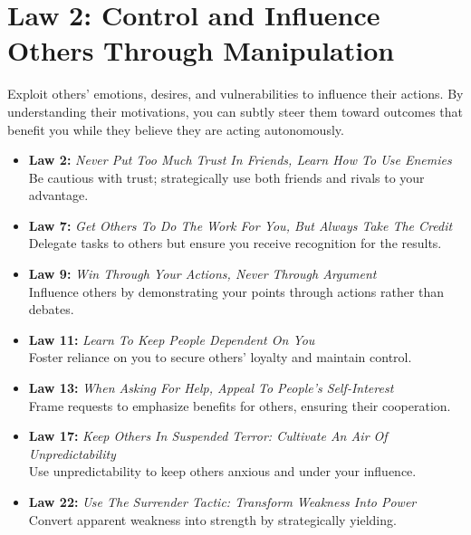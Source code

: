 \documentclass[a4paper,10.8pt]{article}
\begin{document}
\clearpage

\section*{Law 2: Control and Influence Others Through Manipulation}
Exploit others' emotions, desires, and vulnerabilities to influence their actions. By understanding their motivations, you can subtly steer them toward outcomes that benefit you while they believe they are acting autonomously.

\begin{itemize}[leftmargin=*, label={--}]
    \item \textbf{Law 2:} \textit{Never Put Too Much Trust In Friends, Learn How To Use Enemies} \\
    Be cautious with trust; strategically use both friends and rivals to your advantage.
    
    \item \textbf{Law 7:} \textit{Get Others To Do The Work For You, But Always Take The Credit} \\
    Delegate tasks to others but ensure you receive recognition for the results.
    
    \item \textbf{Law 9:} \textit{Win Through Your Actions, Never Through Argument} \\
    Influence others by demonstrating your points through actions rather than debates.
    
    \item \textbf{Law 11:} \textit{Learn To Keep People Dependent On You} \\
    Foster reliance on you to secure others' loyalty and maintain control.
    
    \item \textbf{Law 13:} \textit{When Asking For Help, Appeal To People's Self-Interest} \\
    Frame requests to emphasize benefits for others, ensuring their cooperation.
    
    \item \textbf{Law 17:} \textit{Keep Others In Suspended Terror: Cultivate An Air Of Unpredictability} \\
    Use unpredictability to keep others anxious and under your influence.
    
    \item \textbf{Law 22:} \textit{Use The Surrender Tactic: Transform Weakness Into Power} \\
    Convert apparent weakness into strength by strategically yielding.
    

\end{itemize}
\end{document}
